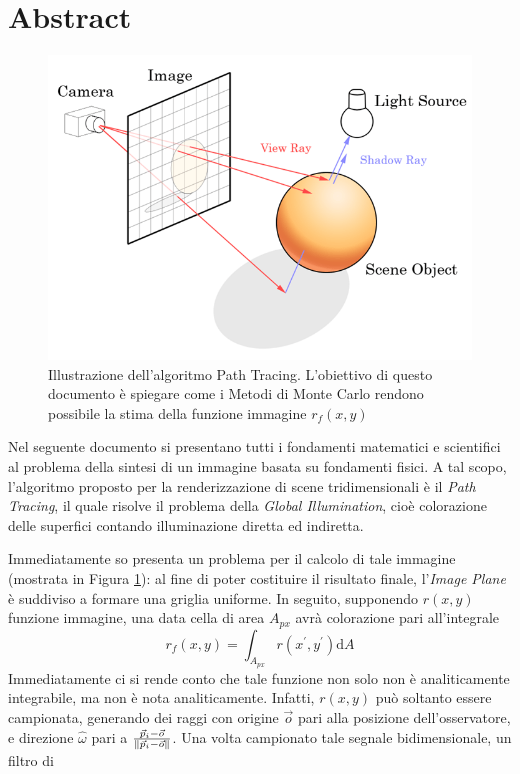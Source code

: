 \documentclass[12pt, openany]{book}
\theoremstyle{theoremdd}
\begin{document}
	\section*{Abstract}
	\begin{figure}[t]
		\centering
		\includegraphics[width=0.6\linewidth]{./assets/intro_path_tracing_online_tech_tips.png}
		\caption{Illustrazione dell'algoritmo Path Tracing. L'obiettivo di questo documento \`e spiegare come i Metodi di Monte Carlo rendono 
			possibile la stima della funzione immagine $r_f(x,y)$}
		\label{intro:pathTracing}
	\end{figure}
	Nel seguente documento si presentano tutti i fondamenti matematici e scientifici al problema della sintesi di un immagine basata su fondamenti 
	fisici. A tal scopo, l'algoritmo proposto per la renderizzazione di scene tridimensionali \`e il \textit{Path Tracing}, il quale risolve il problema
	della \textit{Global Illumination}, cio\`e colorazione delle superfici contando illuminazione diretta ed indiretta.\par
	Immediatamente so presenta un problema per il calcolo di tale immagine (mostrata in Figura \ref{intro:pathTracing}): al fine di poter costituire 
	il risultato finale, l'\textit{Image Plane} \`e suddiviso a formare una griglia uniforme. In seguito, supponendo $r(x,y)$ funzione immagine,
	una data cella di area $A_{px}$ avr\`a colorazione pari all'integrale 
	\begin{equation}
		r_f(x,y)=\int_{A_{px}}r(x^\prime,y^\prime)\mathrm{d}A
	\end{equation}
	Immediatamente ci si rende conto che tale funzione non solo non \`e analiticamente integrabile, ma non \`e nota analiticamente. Infatti, $r(x,y)$
	pu\`o soltanto essere campionata, generando dei raggi con origine $\vec{o}$ pari alla posizione dell'osservatore, e direzione $\hat{\omega}$
	pari a $\mathmakebox{\tfrac{\vec{p}_i-\vec{o}}{\norm{\vec{p}_i-\vec{o}}}}$. Una volta campionato tale segnale bidimensionale, un filtro di
\end{document}

